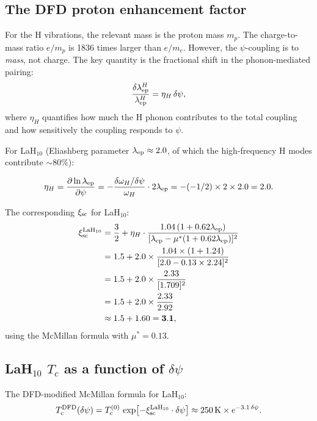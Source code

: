 \documentclass[11pt]{article}
\newcommand{\Tc}{T_{\rm c}}
\begin{document}
\subsection{The DFD proton enhancement factor}

For the H vibrations, the relevant mass is the proton mass $m_p$.
The charge-to-mass ratio $e/m_p$ is 1836 times larger than $e/m_e$.
However, the $\psi$-coupling is to \emph{mass}, not charge. The key quantity
is the fractional shift in the phonon-mediated pairing:
\begin{equation}
\frac{\delta\lambda_{\rm ep}^H}{\lambda_{\rm ep}^H}
= \eta_H\,\delta\psi,
\label{eq:dlamH}
\end{equation}
where $\eta_H$ quantifies how much the H phonon contributes to the total
coupling and how sensitively the coupling responds to $\psi$.

For LaH$_{10}$ (Eliashberg parameter $\lambda_{\rm ep} \approx 2.0$, of which
the high-frequency H modes contribute $\sim 80\%$):

\begin{equation}
\eta_H = \frac{\partial \ln\lambda_{\rm ep}}{\partial\psi}
= -\frac{\delta\omega_H/\delta\psi}{\omega_H}\cdot 2\lambda_{\rm ep}
= -(-1/2) \times 2 \times 2.0 = 2.0.
\label{eq:eta_H}
\end{equation}

The corresponding $\xi_{\rm sc}$ for LaH$_{10}$:
\begin{align}
\xi_{\rm sc}^{\rm LaH_{10}}
&= \frac{3}{2} + \eta_H \cdot \frac{1.04\,(1 + 0.62\lambda_{\rm ep})}
  {[\lambda_{\rm ep} - \mu^*(1 + 0.62\lambda_{\rm ep})]^2} \notag\\
&= 1.5 + 2.0 \times \frac{1.04 \times (1 + 1.24)}
  {[2.0 - 0.13\times 2.24]^2} \notag\\
&= 1.5 + 2.0 \times \frac{2.33}{[1.709]^2} \notag\\
&= 1.5 + 2.0 \times \frac{2.33}{2.92} \notag\\
&\approx 1.5 + 1.60 = \mathbf{3.1},
\label{eq:xi-LaH10}
\end{align}
using the McMillan formula with $\mu^* = 0.13$.

\subsection{LaH$_{10}$ $T_c$ as a function of $\delta\psi$}

The DFD-modified McMillan formula for LaH$_{10}$:
\begin{equation}
\Tc^{\rm DFD}(\delta\psi) = \Tc^{(0)}\,
  \exp\!\left[-\xi_{\rm sc}^{\rm LaH_{10}} \cdot \delta\psi\right]
  \approx 250\,\text{K} \times e^{-3.1\,\delta\psi}.
\label{eq:Tc-LaH10}
\end{equation}
\end{document}
